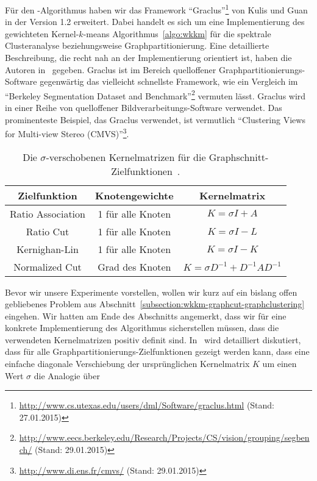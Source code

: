 Für den \kkmpp-Algorithmus haben wir das Framework
"`Graclus"'\footnote{\url{http://www.cs.utexas.edu/users/dml/Software/graclus.html} (Stand: 27.01.2015)} von Kulis und Guan
in der Version 1.2 erweitert. Dabei handelt es sich um eine Implementierung des gewichteten Kernel-$k$-means Algorithmus~\ref{algo:wkkm} für
die spektrale Clusteranalyse beziehungsweise Graphpartitionierung. Eine detaillierte Beschreibung, die recht nah an
der Implementierung orientiert ist, haben die Autoren in~\cite{DhillonGK07} gegeben. Graclus ist im Bereich quelloffener
Graphpartitionierungs-Software gegenwärtig das vielleicht schnellste Framework, wie ein Vergleich im
"`Berkeley Segmentation Dataset and
Benchmark"'\footnote{\url{http://www.eecs.berkeley.edu/Research/Projects/CS/vision/grouping/segbench/} (Stand: 29.01.2015)}
vermuten lässt. Graclus wird in einer Reihe von quelloffener Bildverarbeitungs-Software verwendet. Das prominenteste Beispiel,
das Graclus verwendet, ist vermutlich "`Clustering Views for Multi-view
Stereo (CMVS)"'\footnote{\url{http://www.di.ens.fr/cmvs/} (Stand: 29.01.2015)}.
\absatz
\begin{table}[t]
\centering
\begin{tabular}{@{}ccc@{}} \toprule
	\textbf{Zielfunktion} & \textbf{Knotengewichte} & \textbf{Kernelmatrix} \\ \midrule
	Ratio Association & 1 für alle Knoten & $K = \sigma I + A$ \\
	Ratio Cut & 1 für alle Knoten & $K = \sigma I - L$ \\
	Kernighan-Lin & 1 für alle Knoten & $K = \sigma I - K$ \\
	Normalized Cut & Grad des Knoten & $K = \sigma D^{-1} + D^{-1} A D^{-1}$ \\ \bottomrule
\end{tabular}
\caption{Die $\sigma$-verschobenen Kernelmatrizen für die Graphschnitt-Zielfunktionen~\cite{DhillonGK04}.}
\label{tbl:experiment-kernel-matrices}
\end{table}
Bevor wir unsere Experimente vorstellen, wollen wir kurz auf ein bislang offen gebliebenes Problem aus
Abschnitt~\ref{subsection:wkkm-graphcut-graphclustering} eingehen. Wir hatten am Ende des Abschnitts angemerkt, dass
wir für eine konkrete Implementierung des Algorithmus sicherstellen müssen, dass die verwendeten Kernelmatrizen positiv definit
sind. In~\cite{DhillonGK07} wird detailliert diskutiert, dass für alle Graphpartitionierungs-Zielfunktionen gezeigt werden kann,
dass eine einfache diagonale Verschiebung der ursprünglichen Kernelmatrix $K$ um einen Wert $\sigma$ die Analogie über
